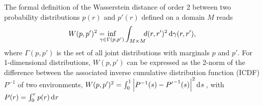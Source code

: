 The formal definition of the Wasserstein distance of order 2 between two probability distributions $p(r)$ and $p'(r)$ defined on a domain $M$ reads
\begin{equation}
W(p,p')^2 = \hspace{-1em}\inf_{\gamma\in\Gamma (p,p')} \int_{M\times M}\hspace{-0.5em}d(r,r')^2\,\mathrm{d}\gamma(r,r'),
%
\end{equation}
where $\Gamma(p,p')$ is the set of all joint distributions with marginals $p$ and $p'$.
For 1-dimensional distributions, $W(p,p')$ can be expressed as the 2-norm of the difference between the associated inverse cumulative distribution function (ICDF) $P^{-1}$ of two environments,
$W(p,p')^2=\int_0^1  \left|P^{-1}(s) -{P'}^{-1}(s)\right|^2\mathop{}\!\mathrm{d}^{}{s}\,$, with $P(r)=\int_0^r p(r)\mathop{}\!\mathrm{d}^{}{r}\,$ 

